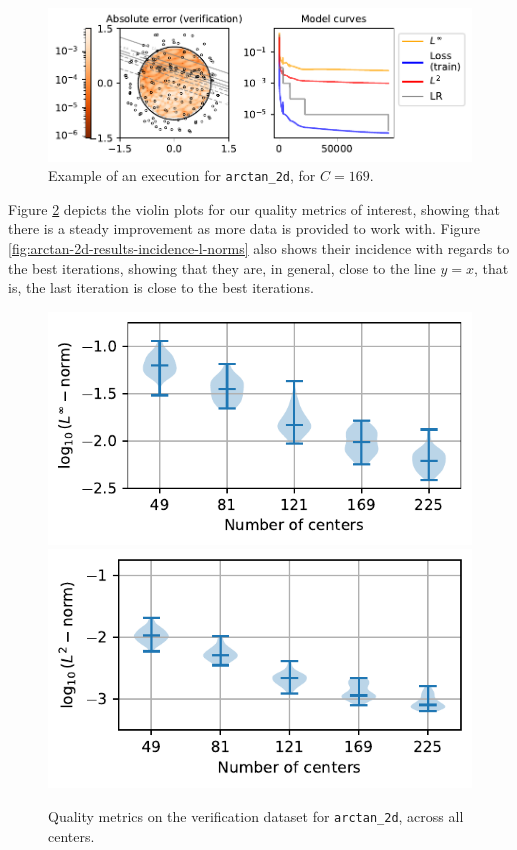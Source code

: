 \documentclass[12pt]{report} %
\begin{document}
\begin{figure}
  \includegraphics[width=\textwidth]{imagenes/experiments/2d/statistical_2d_full_scheduler_interpolation/arctan_2d/arctan_paper_2d-TR26-C169-Kgaussian_kernel-Sh3.1738-10-E77017.pdf}
  \caption{Example of an execution for \texttt{arctan\_2d}, for $C=169$.}
  \label{fig:example-execution-arctan-2d}
\end{figure}

Figure \ref{fig:violins-arctan-2d} depicts the violin plots for our quality metrics of interest, showing that there is a steady improvement as more data is provided to work with. Figure \ref{fig:arctan-2d-results-incidence-l-norms} also shows their incidence with regards to the best iterations, showing that they are, in general, close to the line $y=x$, that is, the last iteration is close to the best iterations.

\begin{figure}
  \includegraphics[width=.45\textwidth]{imagenes/experiments/2d/statistical_2d_full_scheduler_interpolation/arctan_2d/violins_linf_arctan_paper_2d_endgame.pdf}
  \includegraphics[width=.45\textwidth]{imagenes/experiments/2d/statistical_2d_full_scheduler_interpolation/arctan_2d/violins_l2_arctan_paper_2d_endgame.pdf}
  \caption{Quality metrics on the verification dataset for \texttt{arctan\_2d}, across all centers.}
  \label{fig:violins-arctan-2d}
\end{figure}
\end{document}
